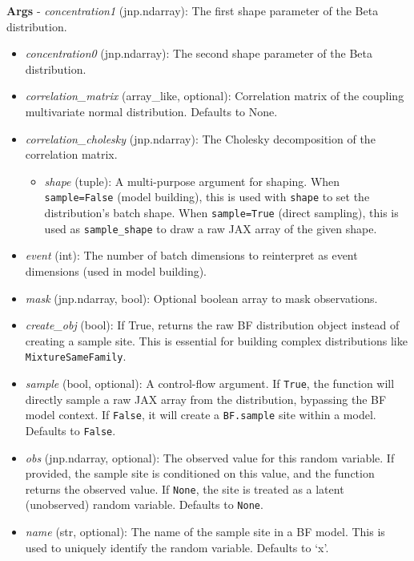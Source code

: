 \documentclass[
  letterpaper,
  DIV=11,
  numbers=noendperiod]{scrartcl}
\providecommand{\tightlist}{%
  \setlength{\itemsep}{0pt}\setlength{\parskip}{0pt}}\usepackage{longtable,booktabs,array}
\begin{document}
\textbf{Args} - \emph{concentration1} (jnp.ndarray): The first shape
parameter of the Beta distribution.

\begin{itemize}
\item
  \emph{concentration0} (jnp.ndarray): The second shape parameter of the
  Beta distribution.
\item
  \emph{correlation\_matrix} (array\_like, optional): Correlation matrix
  of the coupling multivariate normal distribution. Defaults to None.
\item
  \emph{correlation\_cholesky} (jnp.ndarray): The Cholesky decomposition
  of the correlation matrix.

  \begin{itemize}
  \tightlist
  \item
    \emph{shape} (tuple): A multi-purpose argument for shaping. When
    \texttt{sample=False} (model building), this is used with
    \texttt{shape} to set the distribution's batch shape. When
    \texttt{sample=True} (direct sampling), this is used as
    \texttt{sample\_shape} to draw a raw JAX array of the given shape.
  \end{itemize}
\item
  \emph{event} (int): The number of batch dimensions to reinterpret as
  event dimensions (used in model building).
\item
  \emph{mask} (jnp.ndarray, bool): Optional boolean array to mask
  observations.
\item
  \emph{create\_obj} (bool): If True, returns the raw BF distribution
  object instead of creating a sample site. This is essential for
  building complex distributions like \texttt{MixtureSameFamily}.
\item
  \emph{sample} (bool, optional): A control-flow argument. If
  \texttt{True}, the function will directly sample a raw JAX array from
  the distribution, bypassing the BF model context. If \texttt{False},
  it will create a \texttt{BF.sample} site within a model. Defaults to
  \texttt{False}.
\item
  \emph{obs} (jnp.ndarray, optional): The observed value for this random
  variable. If provided, the sample site is conditioned on this value,
  and the function returns the observed value. If \texttt{None}, the
  site is treated as a latent (unobserved) random variable. Defaults to
  \texttt{None}.
\item
  \emph{name} (str, optional): The name of the sample site in a BF
  model. This is used to uniquely identify the random variable. Defaults
  to `x'.
\end{itemize}
\end{document}
